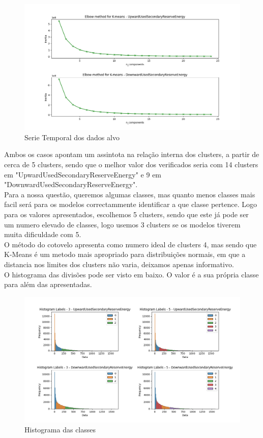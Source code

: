 \begin{figure}[H]
  \centering
  \includegraphics[width=\textwidth]{../plots/elbow_test.png}
  \caption{Serie Temporal dos dados alvo}
\end{figure}


Ambos os casos apontam um assintota na relação interna dos clusters, a partir de cerca de 5 clusters, sendo que o melhor valor dos verificados seria com 14 clusters em "UpwardUsedSecondaryReserveEnergy" e 9 em "DownwardUsedSecondaryReserveEnergy". \\
Para a nossa questão, queremos algumas classes, mas quanto menos classes mais facil será para os modelos correctammente identificar a que classe pertence. Logo para os valores apresentados, escolhemos 5 clusters, sendo que este já pode ser um numero elevado de classes, logo usemos 3 clusters se os modelos tiverem muita dificuldade com 5. \\
O método do cotovelo apresenta como numero ideal de clusters 4, mas sendo que K-Means é um metodo mais apropriado para distribuições normais, em que a distancia nos limites dos clusters não varia, deixamos apenas informativo. \\

O histograma das divisões pode ser visto em baixo. O valor é a sua própria classe para além das apresentadas.

\begin{figure}[H]
  \centering
  \includegraphics[width=\textwidth]{../plots/clusters_histogram.png}
  \caption{Histograma das classes}
\end{figure}

